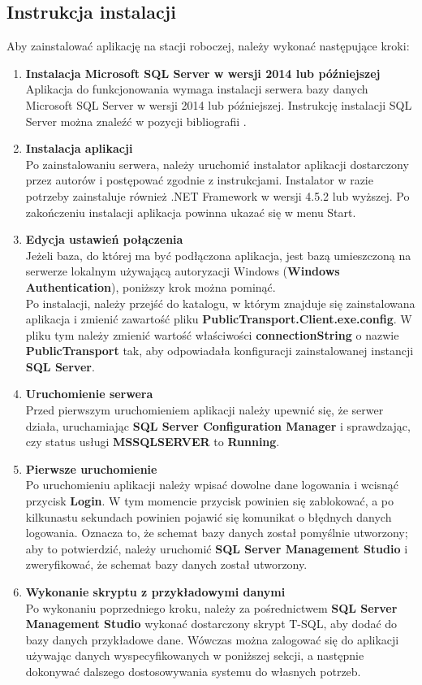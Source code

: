 \documentclass[10pt,a4paper]{article}
\begin{document}
\subsection{Instrukcja instalacji}
Aby zainstalować aplikację na stacji roboczej, należy wykonać następujące kroki:

\begin{enumerate}
	\item \textbf{Instalacja Microsoft SQL Server w wersji 2014 lub późniejszej} \\
	Aplikacja do funkcjonowania wymaga instalacji serwera bazy danych Microsoft SQL Server w wersji 2014 lub późniejszej. Instrukcję instalacji SQL Server można znaleźć w pozycji bibliografii \cite{sqlserver}.
	\item \textbf{Instalacja aplikacji} \\
	Po zainstalowaniu serwera, należy uruchomić instalator aplikacji dostarczony przez autorów i postępować zgodnie z instrukcjami. Instalator w razie potrzeby zainstaluje również .NET Framework w wersji 4.5.2 lub wyższej. Po zakończeniu instalacji aplikacja powinna ukazać się w menu Start.
	\item \textbf{Edycja ustawień połączenia} \\
	Jeżeli baza, do której ma być podłączona aplikacja, jest bazą umieszczoną na serwerze lokalnym używającą autoryzacji Windows (\textbf{Windows Authentication}), poniższy krok można pominąć. \\
	Po instalacji, należy przejść do katalogu, w którym znajduje się zainstalowana aplikacja i zmienić zawartość pliku \textbf{PublicTransport.Client.exe.config}. W pliku tym należy zmienić wartość właściwości \textbf{connectionString} o nazwie \textbf{PublicTransport} tak, aby odpowiadała konfiguracji zainstalowanej instancji \textbf{SQL Server}.
	\item \textbf{Uruchomienie serwera} \\
	Przed pierwszym uruchomieniem aplikacji należy upewnić się, że serwer działa, uruchamiając \textbf{SQL Server Configuration Manager} i sprawdzając, czy status usługi \textbf{MSSQLSERVER} to \textbf{Running}.
	\item \textbf{Pierwsze uruchomienie} \\
	Po uruchomieniu aplikacji należy wpisać dowolne dane logowania i wcisnąć przycisk \textbf{Login}. W tym momencie przycisk powinien się zablokować, a po kilkunastu sekundach powinien pojawić się komunikat o błędnych danych logowania. Oznacza to, że schemat bazy danych został pomyślnie utworzony; aby to potwierdzić, należy uruchomić \textbf{SQL Server Management Studio} i zweryfikować, że schemat bazy danych został utworzony.
	\item \textbf{Wykonanie skryptu z przykładowymi danymi} \\
	Po wykonaniu poprzedniego kroku, należy za pośrednictwem \textbf{SQL Server Management Studio} wykonać dostarczony skrypt T-SQL, aby dodać do bazy danych przykładowe dane. Wówczas można zalogować się do aplikacji używając danych wyspecyfikowanych w poniższej sekcji, a następnie dokonywać dalszego dostosowywania systemu do własnych potrzeb.
\end{enumerate}
\end{document}
